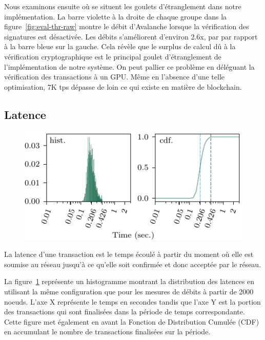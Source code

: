 Nous examinons ensuite où se situent les goulets d'étranglement dans notre implémentation.
La barre violette à la droite de chaque groupe dans la figure~\ref{fig:eval-thr-raw} montre le débit
d'Avalanche lorsque la vérification des signatures est désactivée. Les débits s'améliorent d'environ 2.6x, par
par rapport à la barre bleue sur la gauche.
Cela révèle que le surplus de calcul dû à la vérification cryptographique est le principal goulet d'étranglement
de l'implémentation de notre système. On peut pallier ce problème en déléguant la vérification des transactions
à un GPU\@. Même en l'absence d'une telle optimisation, 7K tps dépasse de loin ce qui existe en matière de blockchain.

\subsection{Latence}

\begin{figure}
\includegraphics[width=\linewidth]{figures/lat.pdf}
\label{fig:eval-lat1}
\end{figure}

La latence d'une transaction est le temps écoulé à partir du moment où elle est soumise au réseau jusqu'à ce qu'elle
soit confirmée et donc acceptée par le réseau.

La figure~\ref{fig:eval-lat1} représente un histogramme montrant la distribution des latences en utilisant la
même configuration que pour les mesures de débits à partir de 2000 noeuds. L'axe X représente le temps en secondes
tandis que l'axe Y est la portion des transactions qui sont finalisées dans la période de temps correspondante.
Cette figure met également en avant la Fonction de Distribution Cumulée (CDF) en accumulant le nombre de
transactions finalisées sur la période.

